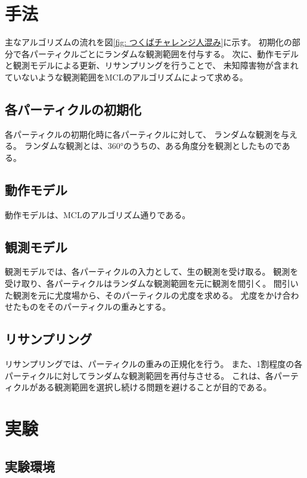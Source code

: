 \documentclass{jarticle}
\begin{document}
\section{手法}%

主なアルゴリズムの流れを図\ref{fig: つくばチャレンジ人混み}に示す。
初期化の部分で各パーティクルごとにランダムな観測範囲を付与する。
次に、動作モデルと観測モデルによる更新、リサンプリングを行うことで、
未知障害物が含まれていないような観測範囲をMCLのアルゴリズムによって求める。


\subsection{各パーティクルの初期化}

各パーティクルの初期化時に各パーティクルに対して、
ランダムな観測を与える。
ランダムな観測とは、360°のうちの、ある角度分を観測としたものである。

\subsection{動作モデル}

動作モデルは、MCLのアルゴリズム通りである。

\subsection{観測モデル}

観測モデルでは、各パーティクルの入力として、生の観測を受け取る。
観測を受け取り、各パーティクルはランダムな観測範囲を元に観測を間引く。
間引いた観測を元に尤度場から、そのパーティクルの尤度を求める。
尤度をかけ合わせたものをそのパーティクルの重みとする。

\subsection{リサンプリング}

リサンプリングでは、パーティクルの重みの正規化を行う。
また、1割程度の各パーティクルに対してランダムな観測範囲を再付与させる。
これは、各パーティクルがある観測範囲を選択し続ける問題を避けることが目的である。

\section{実験}%

\subsection{実験環境}
\end{document}
